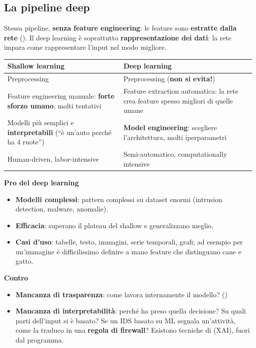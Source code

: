 \subsection{La pipeline deep}
Stessa pipeline, \textbf{senza feature engineering}: le feature sono \textbf{estratte dalla rete}
(). Il deep learning è soprattutto \textbf{rappresentazione dei dati}: la rete
impara come rappresentare l'input nel modo migliore.

\begin{center}
\small
\begin{tabularx}{\textwidth}{X X}
\toprule
\textbf{Shallow learning} & \textbf{Deep learning}\\
\midrule
Preprocessing & Preprocessing (\textbf{non si evita!})\\
Feature engineering manuale: \textbf{forte sforzo umano}, molti tentativi & Feature extraction automatica: la rete crea feature spesso migliori di quelle umane\\
Modelli più semplici e \textbf{interpretabili} (``è un'auto perché ha 4 ruote'') & \textbf{Model engineering}: scegliere l'architettura, molti iperparametri\\
Human-driven, labor-intensive & Semi-automatico, computationally intensive\\
\bottomrule
\end{tabularx}
\end{center}

\textbf{Pro del deep learning}
\begin{itemize}
  \item \textbf{Modelli complessi}: pattern complessi su dataset enormi (intrusion detection, malware, anomalie).
  \item \textbf{Efficacia}: superano il plateau del shallow e generalizzano meglio.
  \item \textbf{Casi d'uso}: tabelle, testo, immagini, serie temporali, grafi; ad esempio per un'immagine è
        difficilissimo definire a mano feature che distinguano cane e gatto.
\end{itemize}
\textbf{Contro}
\begin{itemize}
  \item \textbf{Mancanza di trasparenza}: come lavora internamente il modello? ()
  \item \textbf{Mancanza di interpretabilità}: perché ha preso quella decisione? Su quali parti
        dell'input si è basato? Se un IDS basato su ML segnala un'attività, come la traduco in una
        \textbf{regola di firewall}? Esistono tecniche di  (XAI), fuori dal programma.
\end{itemize}

